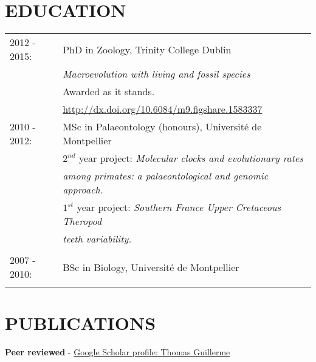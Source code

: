 \documentclass[10pt,a4paper]{article}
\begin{document}
{%
\section{EDUCATION}
\raggedright
\begin{tabular}{ll} 
2012 - 2015: & PhD in Zoology, Trinity College Dublin\\
& \textit{Macroevolution with living and fossil species} \\
& Awarded as it stands. \\
& \href{http://figshare.com/articles/Macroevolution_with_living_and_fossil_species/1583337}{http://dx.doi.org/10.6084/m9.figshare.1583337} \\
2010 - 2012: & MSc in Palaeontology (honours), Universit\'{e} de Montpellier\\
& $2^{nd}$ year project: \textit{Molecular clocks and evolutionary rates}\\
& \textit{among primates: a palaeontological and genomic approach.} \\
& $1^{st}$ year project: \textit{Southern France Upper Cretaceous Theropod}\\
& \textit{teeth variability.} \\
& \\
2007 - 2010: & BSc in Biology, Universit\'{e} de Montpellier\\
& \\
\end{tabular}

\section{PUBLICATIONS}
\raggedright\textbf{Peer reviewed} - \href{https://scholar.google.co.uk/citations?user=LA9l9EkAAAAJ&hl=en}{Google Scholar profile: Thomas Guillerme}\\[1.5ex]

}
\end{document}
